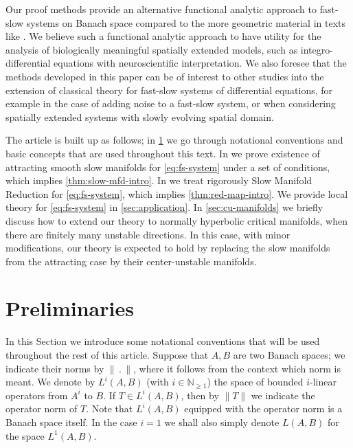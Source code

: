 \documentclass[a4paper]{siamart190516}
\begin{document}
Our proof methods provide an alternative functional analytic approach to fast-slow systems 
on Banach space compared to the more geometric material in texts like \cite{BaLuZe98, BaLuZe08, MeHa01}.
We believe such a functional analytic approach to have utility for the analysis of biologically meaningful
spatially extended models, such as integro-differential equations with neuroscientific interpretation. We
also foresee that the methods developed in this paper can be of interest to other studies
into the extension of classical theory for fast-slow systems of differential equations, for example in the 
case of adding noise to a fast-slow system, or when considering spatially extended systems with slowly 
evolving spatial domain.
 
The article is built up as follows; in \cref{sec:preliminaries} we go through notational conventions 
and basic concepts that are used throughout this text. 
In  we prove
existence of attracting smooth slow manifolds for \cref{eq:fs-system} under a set of
conditions, which implies \cref{thm:slow-mfd-intro}. In
 we treat rigorously
Slow Manifold Reduction for  \cref{eq:fs-system}, which implies
\cref{thm:red-map-intro}. We provide local theory for \cref{eq:fs-system} in
\cref{sec:application}. In \cref{sec:cu-manifolds}
we briefly discuss how to extend our theory to normally hyperbolic critical
manifolds, when there are finitely many unstable directions. In this case, with minor
modifications, our theory is expected to hold by replacing the slow manifolds from the
attracting case by their center-unstable manifolds. 



 \section{Preliminaries}\label{sec:preliminaries}
 
 In this Section we introduce some notational conventions that will be used throughout the rest of this article. Suppose that $A,B$ are two Banach spaces; we indicate their norms by $\| \, . \, \|$, where it follows from the context which norm is meant. We denote by $L^i(A,B)$ (with $i \in \mathbb{N}_{\geq 1}$) the space of bounded $i$-linear operators from $A^i$ to $B$. If $T \in L^i(A,B)$, then by $\| T \|$ we indicate the operator norm of $T$. Note that $L^i(A,B)$ equipped with the operator norm is a Banach space itself. In the case $i=1$ we shall also simply denote $L(A,B)$ for the space $L^1(A,B)$.
 
\end{document}
